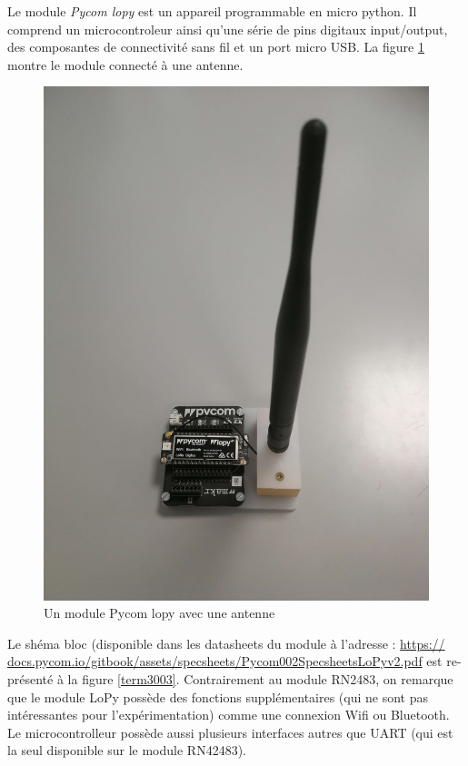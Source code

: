Le module \textit{Pycom lopy} \cite{sitepycom} est un appareil programmable en micro python. Il comprend un microcontroleur ainsi qu'une série de pins digitaux input/output,  des composantes de connectivité sans fil et un port micro USB. La figure \ref{term35} montre le module  connecté à une antenne.

\newpage

\begin{figure}[h]
\centering

\includegraphics[scale=0.08]{images/lopy.png}
\caption{Un module Pycom lopy avec une antenne}\label{term35}
\end{figure}


Le shéma bloc (disponible dans les datasheets du module à l'adresse : \href{https://docs.pycom.io/gitbook/assets/specsheets/Pycom_002_Specsheets_LoPy_v2.pdf}{https://
docs.pycom.io/gitbook/assets/specsheets/Pycom002SpecsheetsLoPyv2.pdf} est re-
présenté à la figure \ref{term3003}. Contrairement au module RN2483, on remarque que le module LoPy possède des fonctions supplémentaires 
(qui ne sont pas intéressantes pour l'expérimentation) comme une connexion Wifi ou Bluetooth. Le microcontrolleur possède aussi plusieurs interfaces autres que UART (qui est la seul disponible sur le module RN42483).

